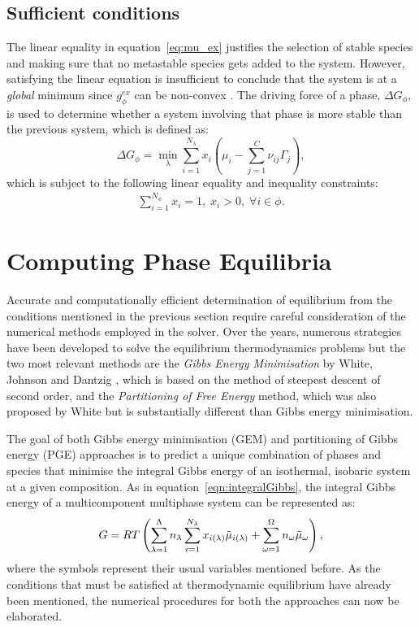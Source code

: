 \subsection{Sufficient conditions}
	The linear equality in equation~\eqref{eq:mu_ex} justifies the selection of stable species and making sure that no metastable species gets added to the system. However, satisfying the linear equation is insufficient to conclude that the system is at a \emph{global} minimum since $g_{\phi}^{ex}$ can be non-convex \cite{Piro16}. The driving force of a phase, $\Delta G_{\phi} $, is used to determine whether a system involving that phase is more stable than the previous system, which is defined as:
	\begin{equation}
        		\Delta G_{\phi}= \min_{\lambda} \sum_{i=1}^{N_{\lambda}}x_{i} \left (\mu_{i} - \sum_{j=1}^C \nu_{ij}\Gamma_j \right ),
    	\end{equation}
	which is subject to the following linear equality and inequality constraints:
	\begin{align}
		\sum_{i=1}^{N_\phi} x_i = 1, \; x_i > 0, \; \forall i \in \phi.
	\end{align}
	

\section{Computing Phase Equilibria}
Accurate and computationally efficient determination of equilibrium from the conditions mentioned in the previous section require careful consideration of the numerical methods employed in the solver. Over the years, numerous strategies have been developed to solve the equilibrium thermodynamics problems but the two most relevant methods are the \emph{Gibbs Energy Minimisation} by White, Johnson and Dantzig \cite{White:58}, which is based on the method of steepest descent of second order, and the \emph{Partitioning of Free Energy} method, which was also proposed by White \cite{White67} but is substantially different than Gibbs energy minimisation.

The goal of both Gibbs energy minimisation (GEM) and partitioning of Gibbs energy (PGE) approaches is to predict a unique combination of phases and species that minimise the integral Gibbs energy of an isothermal, isobaric system at a given composition. As in equation~\eqref{eqn:integralGibbs}, the integral Gibbs energy of a multicomponent multiphase system can be represented as:
\begin{equation}\label{eq:int_gibbs}
    G = RT \left(\sum_{\lambda=1}^{\Lambda} n_\lambda \sum_{i = 1}^{N_{\lambda}} x_{i(\lambda)} \tilde{\mu}_{i(\lambda)} + \sum_{\omega=1}^{\Omega} n_\omega \tilde{\mu}_{\omega}\right),
\end{equation}
where the symbols represent their usual variables mentioned before. 
As the conditions that must be satisfied at thermodynamic equilibrium have already been mentioned, the numerical procedures for  both the approaches can now be elaborated.

